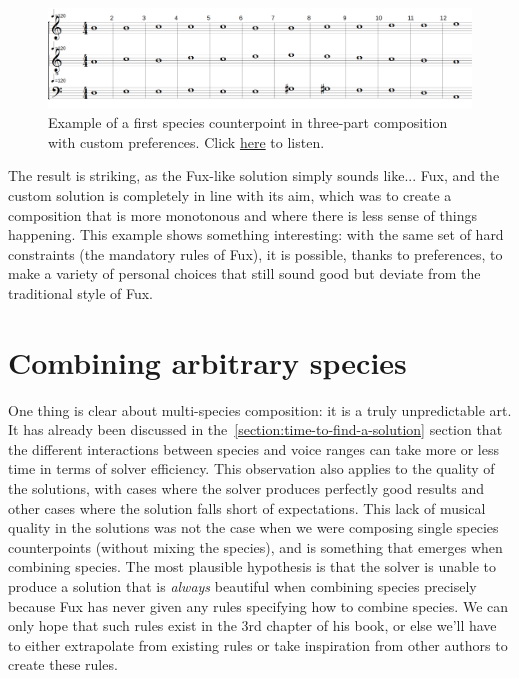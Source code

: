\begin{figure}[h!]
    \centering
    \includegraphics[width=1\textwidth]{Images/Musicality/musicality-1sp-custom-pref.png}
    \caption{Example of a first species counterpoint in three-part composition with custom preferences. Click \href{https://youtu.be/rXGOzidniA0}{here} to listen.}
    \label{fig:musicality-1sp-custom}
\end{figure}

The result is striking, as the Fux-like solution simply sounds like... Fux, and the custom solution is completely in line with its aim, which was to create a composition that is more monotonous and where there is less sense of things happening. This example shows something interesting: with the same set of hard constraints (the mandatory rules of Fux), it is possible, thanks to preferences, to make a variety of personal choices that still sound good but deviate from the traditional style of Fux. 

\section{Combining arbitrary species}
One thing is clear about multi-species composition: it is a truly unpredictable art. It has already been discussed in the~\ref{section:time-to-find-a-solution} section that the different interactions between species and voice ranges can take more or less time in terms of solver efficiency. This observation also applies to the quality of the solutions, with cases where the solver produces perfectly good results and other cases where the solution falls short of expectations. This lack of musical quality in the solutions was not the case when we were composing single species counterpoints (without mixing the species), and is something that emerges when combining species. The most plausible hypothesis is that the solver is unable to produce a solution that is \textit{always} beautiful when combining species precisely because Fux has never given any rules specifying how to combine species. We can only hope that such rules exist in the 3rd chapter of his book, or else we'll have to either extrapolate from existing rules or take inspiration from other authors to create these rules.

